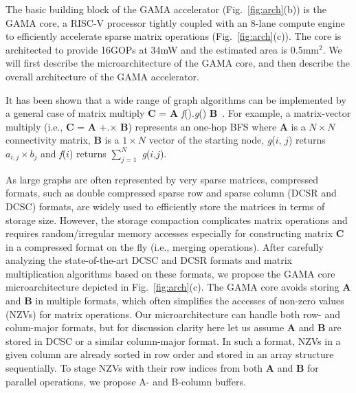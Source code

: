 \noindent
The basic building block of the GAMA accelerator (Fig.~\ref{fig:arch}(b)) is the GAMA core,
a RISC-V processor  tightly coupled with an 8-lane compute engine to efficiently accelerate sparse matrix operations (Fig.~\ref{fig:arch}(c)).
The core is architected to provide 16GOPs at 34mW and the estimated area is 0.5mm$^2$.
We will first describe the microarchitecture of the GAMA core, and then describe the overall architecture of the GAMA accelerator.


It has been shown that a wide range of graph algorithms can be implemented by a general case of matrix multiply \textbf{C} = \textbf{A} \textit{f}().\textit{g}() \textbf{B}~\cite{graph:primitives}. 
For example, a matrix-vector multiply (i.e., \textbf{C} = \textbf{A} +.$\times$ \textbf{B}) represents an one-hop BFS 
where \textbf{A} is a $N \times N$ connectivity matrix, \textbf{B} is a $1 \times N$ vector of the starting node, 
\textit{g}($i$, $j$) returns $a_{i,j} \times b_{j}$ and \textit{f}($i$) returns $\sum_{j=1}^{N}$ \textit{g}($i$,$j$).


As large graphs are often represented by very sparse matrices, compressed formats, such as double compressed sparse row and sparse column (DCSR  and DCSC) formats, are widely used to efficiently store the matrices in terms of storage size.
However, the storage compaction complicates matrix operations and requires random/irregular memory accesses especially for constructing matrix \textbf{C} in a compressed format on the fly (i.e., merging operations).
After carefully analyzing the state-of-the-art DCSC and DCSR formats and matrix multiplication algorithms based on these formats, 
we propose the GAMA core microarchitecture depicted in Fig.~\ref{fig:arch}(c). The GAMA core avoids storing \textbf{A} and \textbf{B} in multiple formats, which often simplifies the accesses of  non-zero values (NZVs) for matrix operations.
Our microarchitecture can handle both row- and colum-major formats, but for discussion clarity here let us assume  \textbf{A} and \textbf{B} are stored in DCSC or a similar column-major format.
In such a format, NZVs in a given column are already sorted in row order and stored in an array structure sequentially. 
To stage NZVs with their row indices from both \textbf{A} and \textbf{B} for parallel operations, we propose A- and B-column buffers. 

